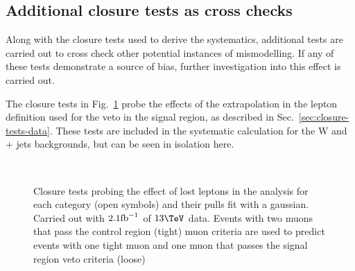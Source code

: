 \subsection{Additional closure tests as cross checks}
\label{sec:closureCrossCheck}

Along with the closure tests used to derive the systematics,
additional tests are carried out to cross check other potential
instances of mismodelling. If any of these tests demonstrate a source
of bias, further investigation into this effect is carried out. 

The closure tests in Fig.~\ref{fig:closureLooseLep} probe the effects
of the extrapolation in the lepton definition used for the veto in the
signal region, as described in Sec.~\ref{sec:closure-tests-data}.
These tests are included in the systematic calculation for the W and
\ttbar + jets backgrounds, but can be seen in isolation here. 

\begin{figure}
  \begin{center}
    ~~
    \caption{Closure tests probing the effect of lost leptons in the
    analysis for each
    \njet category (open symbols) and their pulls fit with a gaussian.
    Carried out with $2.1\ifb$ of
      $13\tev$ data. Events with two muons that pass the control
      region (tight) muon criteria are used to predict events with one
      tight muon and one muon that passes the signal region veto
      criteria (loose)}
    \label{fig:closureLooseLep}
  \end{center} 
\end{figure}

